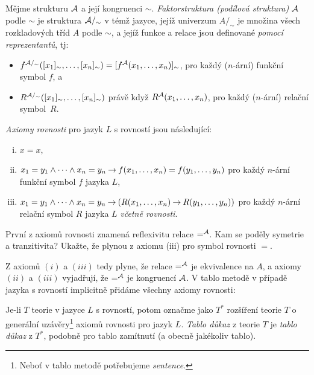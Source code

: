 \begin{definition}[Faktorstruktura]
    Mějme strukturu $\mathcal{A}$ a její kongruenci $\sim$. \emph{Faktorstruktura (podílová struktura)} $\mathcal{A}$ podle $\sim$ je struktura $\mathcal{A}/_\sim$ v témž jazyce, jejíž univerzum $A/_\sim$ je množina všech rozkladových tříd $A$ podle $\sim$, a jejíž funkce a relace jsou definované \emph{pomocí reprezentantů}, tj:
    \begin{itemize}
        \item $f^{\mathcal{A}/_\sim}([x_1]_\sim,\dots,[x_n]_\sim)=[f^{\mathcal{A}}(x_1,\dots,x_n)]_\sim$, pro každý ($n$-ární) funkční symbol $f$, a
        \item $R^{\mathcal{A}/_\sim}([x_1]_\sim,\dots,[x_n]_\sim)$ právě když $R^{\mathcal{A}}(x_1,\dots,x_n)$, pro každý ($n$-ární) relační symbol~$R$.
    \end{itemize} 
    
\end{definition}


\begin{definition}
    \emph{Axiomy rovnosti} pro jazyk $L$ s rovností jsou následující:
    \begin{enumerate}[(i)]
        \item $x=x$,
        \item $x_1=y_1\land\cdots\land x_n=y_n\mathbin{\rightarrow} f(x_1,\dots,x_n)=f(y_1,\dots,y_n)$ pro každý $n$-ární funkční symbol $f$ jazyka $L$,
        \item $x_1=y_1\land\cdots\land x_n=y_n\mathbin{\rightarrow} (R(x_1,\dots,x_n)\mathbin{\rightarrow} R(y_1,\dots,y_n))$ pro každý $n$-ární relační symbol $R$ jazyka $L$ \emph{včetně rovnosti}.
    \end{enumerate}
\end{definition}

\begin{exercise}
    První z axiomů rovnosti znamená reflexivitu relace $=^{\mathcal{A}}$. Kam se poděly symetrie a tranzitivita? Ukažte, že plynou z axiomu (iii) pro symbol rovnosti $=$.
\end{exercise}

Z axiomů $(i)$ a $(iii)$ tedy plyne, že relace $=^{\mathcal{A}}$ je ekvivalence na $A$, a axiomy $(ii)$ a $(iii)$ vyjadřují, že $=^{\mathcal{A}}$ je kongruencí $\mathcal{A}$. V tablo metodě v případě jazyka s rovností implicitně přidáme všechny axiomy rovnosti:

\begin{definition}
    Je-li $T$ teorie v jazyce $L$ s rovností, potom označme jako $T^*$ rozšíření teorie $T$ o generální uzávěry\footnote{Neboť v tablo metodě potřebujeme \emph{sentence}.} axiomů rovnosti pro jazyk $L$. \emph{Tablo důkaz} z teorie $T$ je \emph{tablo důkaz} z $T^*$, podobně pro tablo zamítnutí (a obecně jakékoliv tablo).    
\end{definition}

